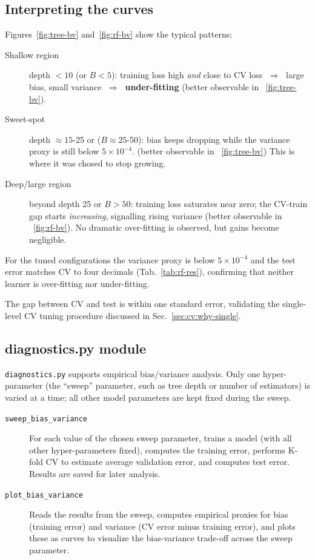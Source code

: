 \documentclass[12pt]{report}
\begin{document}
\subsection{Interpreting the curves}

Figures~\ref{fig:tree-bv} and~\ref{fig:rf-bv} show the typical patterns:

\begin{description}
  \item[Shallow region]  
        depth $<\!10$ (or $B<\!5$): training loss high \emph{and} close to
        CV loss $\;\Rightarrow\;$ large bias, small variance
        $\;\Rightarrow\;$ \textbf{under-fitting} 
        (better observable in ~\ref{fig:tree-bv}).
  \item[Sweet-spot]  
        depth $\approx15$-25 or ($B\approx25$-50): bias keeps dropping while
        the variance proxy is still below $5\!\times\!10^{-4}$.
        (better observable in ~\ref{fig:tree-bv})
        This is where it was chosed to stop growing.
  \item[Deep/large region]  
        beyond depth 25 or $B>50$: training loss saturates near zero; the
        CV-train gap starts \emph{increasing}, signalling rising variance 
        (better observable in ~\ref{fig:rf-bv}).
        No dramatic over-fitting is observed, but gains become negligible.
\end{description}

For the tuned configurations the variance proxy is below $5\times10^{-4}$ and
the test error matches CV to four decimals (Tab.~\ref{tab:rf-res}), confirming
that neither learner is over-fitting nor under-fitting.

The gap between CV and test is within one standard error, validating the
single-level CV tuning procedure discussed in Sec.~\ref{sec:cv:why-single}.

\subsection{diagnostics.py module}
\texttt{diagnostics.py} supports empirical bias/variance analysis. Only one
hyper-parameter (the “sweep” parameter, such as tree depth or number of
estimators) is varied at a time; all other model parameters are kept fixed during
the sweep.

\begin{description}
  \item[\texttt{sweep\_bias\_variance}]
        For each value of the chosen sweep parameter, trains a model (with all
        other hyper-parameters fixed), computes the training error, performs K-fold
        CV to estimate average validation error, and computes test error. Results
        are saved for later analysis.
  \item[\texttt{plot\_bias\_variance}]
        Reads the results from the sweep, computes empirical proxies for bias
        (training error) and variance (CV error minus training error), and plots
        these as curves to visualize the bias-variance trade-off across the sweep
        parameter.
\end{description}
\end{document}
